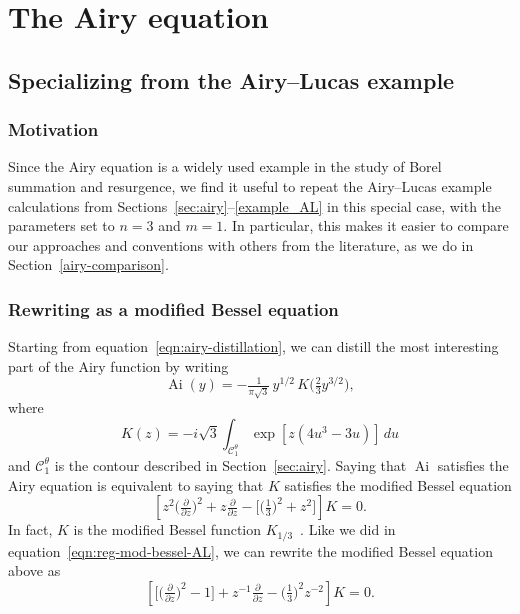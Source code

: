 \documentclass{article}
\DeclareMathOperator{\Ai}{Ai}
\theoremstyle{definition}
\theoremstyle{plain}
\begin{document}
\section{The Airy equation}\label{airy-appendix}
\subsection{Specializing from the Airy--Lucas example}\label{sec:spec-to-airy}
\subsubsection{Motivation}
Since the Airy equation is a widely used example in the study of Borel summation and resurgence, we find it useful to repeat the Airy--Lucas example calculations from Sections~\ref{sec:airy}--\ref{example_AL} in this special case, with the parameters set to $n = 3$ and $m = 1$. In particular, this makes it easier to compare our approaches and conventions with others from the literature, as we do in Section~\ref{airy-comparison}.
\subsubsection{Rewriting as a modified Bessel equation}
Starting from equation~\eqref{eqn:airy-distillation}, we can distill the most interesting part of the Airy function by writing
\[ \Ai(y) = -\tfrac{1}{\pi\sqrt{3}}\,y^{1/2}\,K\big(\tfrac{2}{3} y^{3/2}\big), \]
where
\begin{equation}\label{integral:mod-bessel-airy}
K(z) = -i\sqrt{3} \int_{\mathcal{C}^\theta_1} \exp\left[z \left(4u^3 - 3u\right)\right]\,du
\end{equation}
and $\mathcal{C}^\theta_1$ is the contour described in Section~\ref{sec:airy}. Saying that $\Ai$ satisfies the Airy equation is equivalent to saying that $K$ satisfies the modified Bessel equation
\begin{equation}\label{eqn:mod-bessel-1/3}
\left[z^2 \big(\tfrac{\partial}{\partial z}\big)^2 + z \tfrac{\partial}{\partial z} - \big[\big(\tfrac{1}{3}\big)^2 + z^2\big]\right] K = 0.
\end{equation}
In fact, $K$ is the modified Bessel function $K_{1/3}$~\cite[equation~9.6.1]{dlmf}. Like we did in equation~\eqref{eqn:reg-mod-bessel-AL}, we can rewrite the modified Bessel equation above as 
\begin{equation}\label{eqn:reg-mod-bessel}
\left[ \big[ \big(\tfrac{\partial}{\partial z}\big)^2 - 1 \big] + z^{-1} \tfrac{\partial}{\partial z} - \big(\tfrac{1}{3}\big)^2 z^{-2} \right] K = 0.
\end{equation}
%
\end{document}
